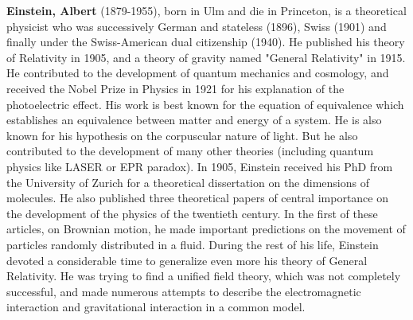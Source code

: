 \textbf{Einstein, Albert} (1879-1955), born in Ulm and die in Princeton, is a theoretical physicist who was successively German and stateless (1896), Swiss (1901) and finally under the Swiss-American dual citizenship (1940). He published his theory of Relativity in 1905, and a theory of gravity named "General Relativity" in 1915. He contributed to the development of quantum mechanics and cosmology, and received the Nobel Prize in Physics in 1921 for his explanation of the photoelectric effect. His work is best known for the equation of equivalence which establishes an equivalence between matter and energy of a system. He is also known for his hypothesis on the corpuscular nature of light. But he also contributed to the development of many other theories (including quantum physics like LASER or EPR paradox). In 1905, Einstein received his PhD from the University of Zurich for a theoretical dissertation on the dimensions of molecules. He also published three theoretical papers of central importance on the development of the physics of the twentieth century. In the first of these articles, on Brownian motion, he made important predictions on the movement of particles randomly distributed in a fluid. During the rest of his life, Einstein devoted a considerable time to generalize even more his theory of General Relativity. He was trying to find a unified field theory, which was not completely successful, and made numerous attempts to describe the electromagnetic interaction and gravitational interaction in a common model.

